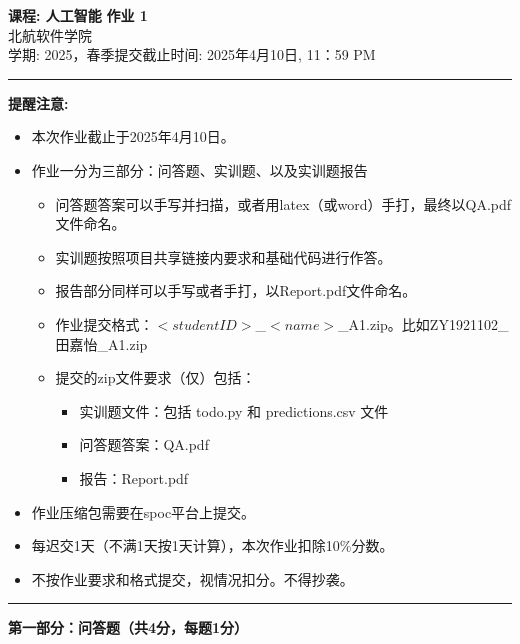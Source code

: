 \documentclass[a4paper, 11pt]{article}
\begin{document}
\begin{CJK}{UTF8}{gbsn}
\noindent
\large\textbf{课程: 人工智能} \hfill \textbf{作业 1}   \\
北航软件学院 \\
\normalsize 学期: 2025，春季\hfill 提交截止时间:  2025年4月10日, 11：59 PM \\
\noindent\rule{7in}{2.8pt}
\textbf{提醒注意:}
\begin{itemize}
\item 本次作业截止于2025年4月10日。
\item 作业一分为三部分：问答题、实训题、以及实训题报告
\begin{itemize}
    \item 问答题答案可以手写并扫描，或者用latex（或word）手打，最终以QA.pdf文件命名。
    \item 实训题按照项目共享链接内要求和基础代码进行作答。
    \item 报告部分同样可以手写或者手打，以Report.pdf文件命名。
    \item 作业提交格式：$<student ID>$\_$<name>$\_A1.zip。比如ZY1921102\_田嘉怡\_A1.zip
    \item 提交的zip文件要求（仅）包括：
    \begin{itemize}
        \item 实训题文件：包括 todo.py 和 predictions.csv 文件
        \item 问答题答案：QA.pdf
        \item 报告：Report.pdf
    \end{itemize}
    
\end{itemize}
\item 作业压缩包需要在spoc平台上提交。
\item 每迟交1天（不满1天按1天计算），本次作业扣除10\%分数。
\item 不按作业要求和格式提交，视情况扣分。不得抄袭。
\end{itemize}

\noindent\rule{7in}{1pt}
\textbf{第一部分：问答题（共4分，每题1分）}


\end{CJK}
\end{document}
